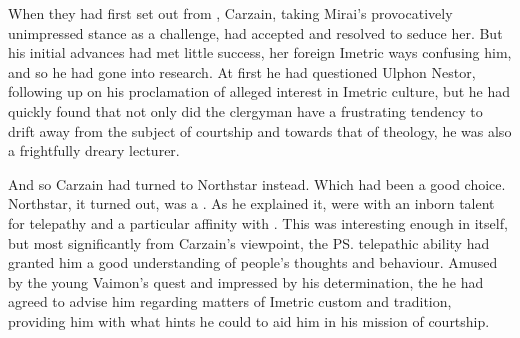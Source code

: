 


When they had first set out from \Bryndwin, Carzain, taking Mirai's provocatively unimpressed stance as a challenge, had accepted and resolved to seduce her. But his initial advances had met little success, her foreign Imetric ways confusing him, and so he had gone into research. At first he had questioned Ulphon Nestor, following up on his proclamation of alleged interest in Imetric culture, but he had quickly found that not only did the clergyman have a frustrating tendency to drift away from the subject of courtship and towards that of theology, he was also a frightfully dreary lecturer. 

And so Carzain had turned to \IlcSR{} Northstar instead. Which had been a good choice. Northstar, it turned out, was a \quo{\nycaneer}. As he explained it, \nycaneers{} were \scathae{} with an inborn talent for telepathy and a particular affinity with \nycans. This was interesting enough in itself, but most significantly from Carzain's viewpoint, the \ps{\IlcSR} telepathic ability had granted him a good understanding of people's thoughts and behaviour. Amused by the young Vaimon's quest and impressed by his determination, the he had agreed to advise him regarding matters of Imetric custom and tradition, providing him with what hints he could to aid him in his mission of courtship. 

